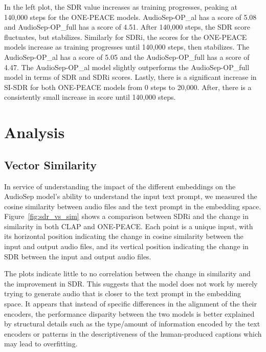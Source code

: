 \documentclass[11pt]{article}
\begin{document}
In the left plot, the SDR value increases as training progresses, peaking at 140,000 steps for the ONE-PEACE models. AudioSep-OP\_al has a score of 5.08 and AudioSep-OP\_full has a score of 4.51. After 140,000 steps, the SDR score fluctuates, but stabilizes. Similarly for SDRi, the scores for the ONE-PEACE models increase as training progresses until 140,000 steps, then stabilizes. The AudioSep-OP\_al has a score of 5.05 and the AudioSep-OP\_full has a score of 4.47. The AudioSep-OP\_al model slightly outperforms the AudioSep-OP\_full model in terms of SDR and SDRi scores. Lastly, there is a significant increase in SI-SDR for both ONE-PEACE models from 0 steps to 20,000. After, there is a consistently small increase in score until 140,000 steps.



\label{fig:val_visuals}


\label{fig:sword_spectrograms}




\section{Analysis}

\subsection{Vector Similarity}

In service of understanding the impact of the different embeddings on the AudioSep model's ability to understand the input text prompt, we measured the cosine similarity between audio files and the text prompt in the embedding space. Figure~\ref{fig:sdr_vs_sim} shows a comparison between SDRi and the change in similarity in both CLAP and ONE-PEACE. Each point is a unique input, with its horizontal position indicating the change in cosine similarity between the input and output audio files, and its vertical position indicating the change in SDR between the input and output audio files.

The plots indicate little to no correlation between the change in similarity and the improvement in SDR. This suggests that the model does not work by merely trying to generate audio that is closer to the text prompt in the embedding space. It appears that instead of specific differences in the alignment of the their encoders, the performance disparity between the two models is better explained by structural details such as the type/amount of information encoded by the text encoders or patterns in the descriptiveness of the human-produced captions which may lead to overfitting.
\end{document}
